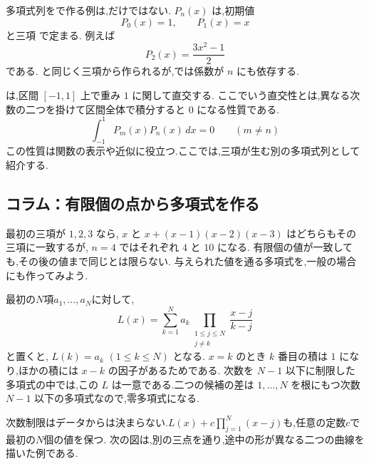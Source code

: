 多項式列をで作る例は,だけではない.
 $P_n(x)$ は,初期値
\[
  P_0(x)=1,\qquad P_1(x)=x
\]
と三項
\BookMathLayout{
  \[
    \begin{aligned}
      (n+1)P_{n+1}(x)&=(2n+1)xP_n(x)\\
      &\quad-nP_{n-1}(x)\qquad(n\ge1)
    \end{aligned}
  \]
}{
  \[
    \begin{aligned}
      (n+1)P_{n+1}(x)&=(2n+1)xP_n(x)\\
      &\quad-nP_{n-1}(x)\qquad(n\ge1)
    \end{aligned}
  \]
}
で定まる.
例えば
\[
  P_2(x)=\frac{3x^2-1}{2}
\]
である.
と同じく三項から作られるが,では係数が $n$ にも依存する.

は,区間 $[-1,1]$ 上で重み $1$ に関して直交する.
ここでいう直交性とは,異なる次数の二つを掛けて区間全体で積分すると $0$ になる性質である.
\[
  \int_{-1}^{1}P_m(x)P_n(x)\,dx=0
  \qquad(m\ne n)
\]
この性質は関数の表示や近似に役立つ.ここでは,三項が生む別の多項式列として紹介する.

\subsection*{コラム：有限個の点から多項式を作る}

最初の三項が $1,2,3$ なら,
$x$ と $x+(x-1)(x-2)(x-3)$ はどちらもその三項に一致するが,
$n=4$ ではそれぞれ $4$ と $10$ になる.
有限個の値が一致しても,その後の値まで同じとは限らない.
与えられた値を通る多項式を,一般の場合にも作ってみよう.

最初の$N$項$a_1,\ldots,a_N$に対して,
\[
  L(x)=\sum_{k=1}^{N}a_k
  \prod_{\substack{1\le j\le N\\j\ne k}}
  \frac{x-j}{k-j}
\]
と置くと, $L(k)=a_k$ $(1\le k\le N)$ となる.
$x=k$ のとき $k$ 番目の積は $1$ になり,ほかの積には $x-k$ の因子があるためである.
次数を $N-1$ 以下に制限した多項式の中では,この $L$ は一意である.二つの候補の差は $1,\ldots,N$ を根にもつ次数 $N-1$ 以下の多項式なので,零多項式になる.

次数制限はデータからは決まらない.$L(x)+c\prod_{j=1}^{N}(x-j)$も,任意の定数$c$で最初の$N$個の値を保つ.
次の図は,別の三点を通り,途中の形が異なる二つの曲線を描いた例である.
\BookFigLagrange

